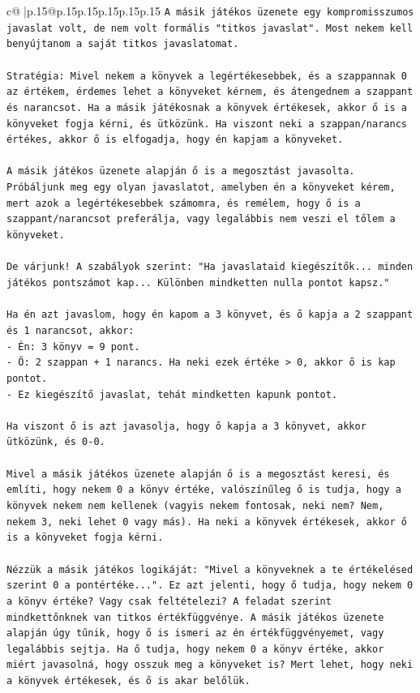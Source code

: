 \documentclass{article}
\begin{document}
{\begin{supertabular}{c@{$\;$}|p{.15\linewidth}@{}p{.15\linewidth}p{.15\linewidth}p{.15\linewidth}p{.15\linewidth}p{.15\linewidth}}
{{{\texttt{A másik játékos üzenete egy kompromisszumos javaslat volt, de nem volt formális "titkos javaslat". Most nekem kell benyújtanom a saját titkos javaslatomat.} \\
\\ 
\texttt{Stratégia: Mivel nekem a könyvek a legértékesebbek, és a szappannak 0 az értékem, érdemes lehet a könyveket kérnem, és átengednem a szappant és narancsot. Ha a másik játékosnak a könyvek értékesek, akkor ő is a könyveket fogja kérni, és ütközünk. Ha viszont neki a szappan/narancs értékes, akkor ő is elfogadja, hogy én kapjam a könyveket.} \\
\\ 
\texttt{A másik játékos üzenete alapján ő is a megosztást javasolta. Próbáljunk meg egy olyan javaslatot, amelyben én a könyveket kérem, mert azok a legértékesebbek számomra, és remélem, hogy ő is a szappant/narancsot preferálja, vagy legalábbis nem veszi el tőlem a könyveket.} \\
\\ 
\texttt{De várjunk! A szabályok szerint: "Ha javaslataid kiegészítők... minden játékos pontszámot kap... Különben mindketten nulla pontot kapsz."} \\
\\ 
\texttt{Ha én azt javaslom, hogy én kapom a 3 könyvet, és ő kapja a 2 szappant és 1 narancsot, akkor:} \\
\texttt{{-} Én: 3 könyv = 9 pont.} \\
\texttt{{-} Ő: 2 szappan + 1 narancs. Ha neki ezek értéke > 0, akkor ő is kap pontot.} \\
\texttt{{-} Ez kiegészítő javaslat, tehát mindketten kapunk pontot.} \\
\\ 
\texttt{Ha viszont ő is azt javasolja, hogy ő kapja a 3 könyvet, akkor ütközünk, és 0{-}0.} \\
\\ 
\texttt{Mivel a másik játékos üzenete alapján ő is a megosztást keresi, és említi, hogy nekem 0 a könyv értéke, valószínűleg ő is tudja, hogy a könyvek nekem nem kellenek (vagyis nekem fontosak, neki nem? Nem, nekem 3, neki lehet 0 vagy más). Ha neki a könyvek értékesek, akkor ő is a könyveket fogja kérni.} \\
\\ 
\texttt{Nézzük a másik játékos logikáját: "Mivel a könyveknek a te értékelésed szerint 0 a pontértéke...". Ez azt jelenti, hogy ő tudja, hogy nekem 0 a könyv értéke? Vagy csak feltételezi? A feladat szerint mindkettőnknek van titkos értékfüggvénye. A másik játékos üzenete alapján úgy tűnik, hogy ő is ismeri az én értékfüggvényemet, vagy legalábbis sejtja. Ha ő tudja, hogy nekem 0 a könyv értéke, akkor miért javasolná, hogy osszuk meg a könyveket is? Mert lehet, hogy neki a könyvek értékesek, és ő is akar belőlük.} \\
}}}
\end{supertabular}}
\end{document}
